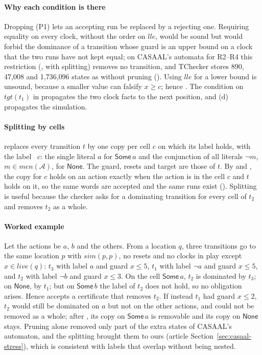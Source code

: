 \paragraph{Why each condition is there} Dropping (P1) lets an accepting run be replaced by a rejecting one. Requiring equality on every clock, without the order on $\mathit{lle}$, would be sound but would forbid the dominance of a transition whose guard is an upper bound on a clock that the two runs have not kept equal; on CASAAL's automata for R2--R4 this restriction (, with splitting) removes no transition, and TChecker stores 890, 47{,}008 and 1{,}736{,}096 states as without pruning (). Using $\mathit{lle}$ for a lower bound is unsound, because a smaller value can falsify $x\ge c$; hence . The condition on $\mathit{tgt}(t_1)$ in  propagates the two clock facts to the next position, and (d) propagates the simulation.

\paragraph{Splitting by cells}  replaces every transition $t$ by one copy per cell $c$ on which its label holds, with the label ~$c$: the single literal $a$ for $\mathsf{Some}\,a$ and the conjunction of all literals $\neg m$, $m\in\mathit{men}(\mathcal A)$, for $\mathsf{None}$. The guard, resets and target are those of $t$. By  and , the copy for $c$ holds on an action exactly when the action is in the cell $c$ and $t$ holds on it, so the same words are accepted and the same runs exist (). Splitting is useful because the checker asks for a dominating transition for every cell of $t_2$ and removes $t_2$ as a whole.

\paragraph{Worked example} Let the actions be $a$, $b$ and the others. From a location $q$, three transitions go to the same location $p$ with $\mathit{sim}(p,p)$, no resets and no clocks in play except $x\in\mathit{live}(q)$: $t_3$ with label $a$ and guard $x\le5$, $t_1$ with label $\neg a$ and guard $x\le 5$, and $t_2$ with label $\neg b$ and guard $x\le 3$. On the cell $\mathsf{Some}\,a$, $t_2$ is dominated by $t_3$; on $\mathsf{None}$, by $t_1$; but on $\mathsf{Some}\,b$ the label of $t_2$ does not hold, so no obligation arises. Hence  accepts a certificate that removes $t_2$. If instead $t_1$ had guard $x\le 2$, $t_2$ would still be dominated on $a$ but not on the other actions, and could not be removed as a whole; after , its copy on $\mathsf{Some}\,a$ is removable and its copy on $\mathsf{None}$ stays. Pruning alone removed only part of the extra states of CASAAL's automaton, and the splitting brought them to ours (article Section~\ref{sec:casaal-stress}), which is consistent with labels that overlap without being nested.

